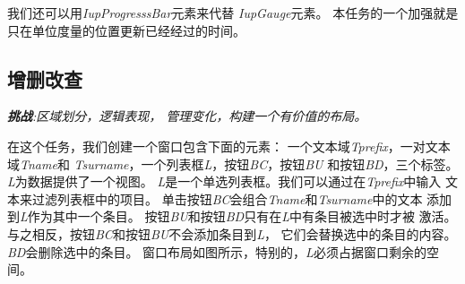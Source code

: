 \documentclass{ctexart}
\begin{document}
我们还可以用\emph{IupProgresssBar}元素来代替
\emph{IupGauge}元素。
本任务的一个加强就是只在单位度量的位置更新已经经过的时间。

\subsection{增删改查}

\emph{\textbf{挑战}:区域划分，逻辑表现，
管理变化，构建一个有价值的布局。}

在这个任务，我们创建一个窗口包含下面的元素：
一个文本域\emph{Tprefix}，一对文本域\emph{Tname}和
\emph{Tsurname}，一个列表框\emph{L}，按钮\emph{BC}，按钮\emph{BU}
和按钮\emph{BD}，三个标签。
\emph{L}为数据提供了一个视图。
\emph{L}是一个单选列表框。我们可以通过在\emph{Tprefix}中输入
文本来过滤列表框中的项目。
单击按钮\emph{BC}会组合\emph{Tname}和\emph{Tsurname}中的文本
添加到\emph{L}作为其中一个条目。
按钮\emph{BU}和按钮\emph{BD}只有在\emph{L}中有条目被选中时才被
激活。与之相反，按钮\emph{BC}和按钮\emph{BU}不会添加条目到\emph{L}，
它们会替换选中的条目的内容。\emph{BD}会删除选中的条目。
窗口布局如图所示，特别的，\emph{L}必须占据窗口剩余的空间。
\end{document}

